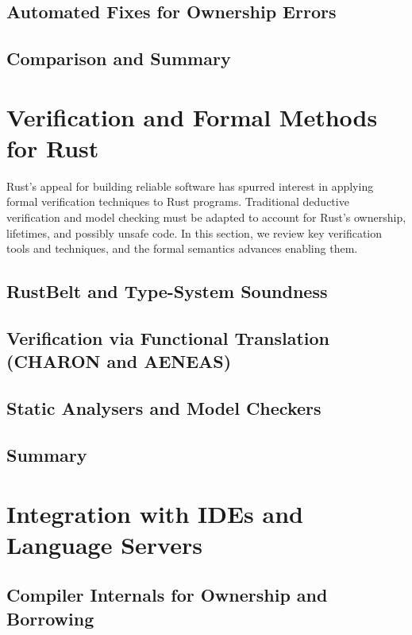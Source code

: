 \subsection{Automated Fixes for Ownership Errors}

\subsection{Comparison and Summary}

\section{Verification and Formal Methods for Rust}
\label{sec:verification_formal_methods}
Rust's appeal for building reliable software has spurred interest in applying
formal verification techniques to Rust programs. Traditional deductive
verification and model checking must be adapted to account for Rust's ownership,
lifetimes, and possibly unsafe code. In this section, we review key verification
tools and techniques, and the formal semantics advances enabling them.

\subsection{RustBelt and Type-System Soundness}

\subsection{Verification via Functional Translation (CHARON and AENEAS)}


\subsection{Static Analysers and Model Checkers}

\subsection{Summary}

\section{Integration with IDEs and Language Servers}
\label{sec:integration_language_server}

\subsection{Compiler Internals for Ownership and Borrowing}

